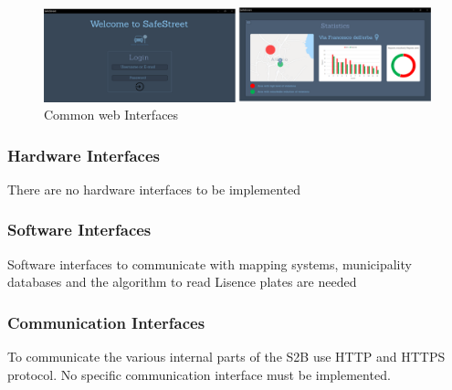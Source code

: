 \begin{figure}[h]
\centering
\includegraphics[width=\textwidth]{Images/desktop_common_interface.png}
\caption{\label{fig:ComWI}Common web Interfaces}
\end{figure}

\subsubsection{Hardware Interfaces}
There are no hardware interfaces to be implemented
\subsubsection{Software Interfaces}
Software interfaces to communicate with mapping systems, municipality databases and the algorithm to read Lisence plates are needed 
\subsubsection{Communication Interfaces }
To communicate the various internal parts of the S2B use HTTP and HTTPS protocol. No specific communication interface must be implemented.
